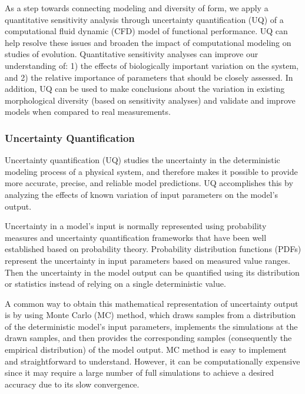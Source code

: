 \documentclass[
]{article}
\begin{document}
As a step towards connecting modeling and diversity of form, we apply a
quantitative sensitivity analysis through uncertainty quantification
(UQ) of a computational fluid dynamic (CFD) model of functional
performance. UQ can help resolve these issues and broaden the impact of
computational modeling on studies of evolution. Quantitative sensitivity
analyses can improve our understanding of: 1) the effects of
biologically important variation on the system, and 2) the relative
importance of parameters that should be closely assessed. In addition,
UQ can be used to make conclusions about the variation in existing
morphological diversity (based on sensitivity analyses) and validate and
improve models when compared to real measurements.

\hypertarget{uncertainty-quantification}{%
\subsubsection{Uncertainty
Quantification}\label{uncertainty-quantification}}

Uncertainty quantification (UQ) studies the uncertainty in the
deterministic modeling process of a physical system, and therefore makes
it possible to provide more accurate, precise, and reliable model
predictions. UQ accomplishes this by analyzing the effects of known
variation of input parameters on the model's output.

Uncertainty in a model's input is normally represented using probability
measures and uncertainty quantification frameworks that have been well
established based on probability theory. Probability distribution
functions (PDFs) represent the uncertainty in input parameters based on
measured value ranges. Then the uncertainty in the model output can be
quantified using its distribution or statistics instead of relying on a
single deterministic value.

A common way to obtain this mathematical representation of uncertainty
output is by using Monte Carlo (MC) method, which draws samples from a
distribution of the deterministic model's input parameters, implements
the simulations at the drawn samples, and then provides the
corresponding samples (consequently the empirical distribution) of the
model output. MC method is easy to implement and straightforward to
understand. However, it can be computationally expensive since it may
require a large number of full simulations to achieve a desired accuracy
due to its slow convergence.
\end{document}
